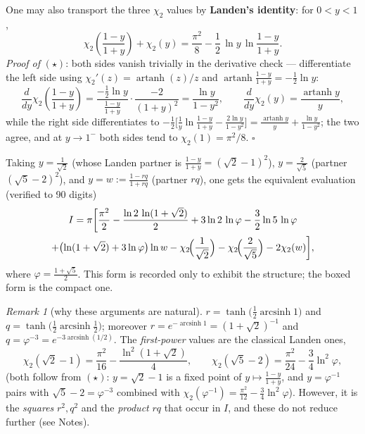 \documentclass[11pt]{article}
\theoremstyle{remark}
\newtheorem*{remark}{Remark}
\begin{document}
One may also transport the three $\chi_2$ values by \textbf{Landen's identity}: for $0<y<1$,
\begin{equation*}
\chi_2\!\left(\frac{1-y}{1+y}\right)+\chi_2(y)=\frac{\pi^2}{8}-\frac12\,\ln y\,\ln\frac{1-y}{1+y}. \tag{$\star$}
\end{equation*}
\emph{Proof of} $(\star)$: both sides vanish trivially in the derivative check --- differentiate the left side using $\chi_2'(z)=\operatorname{artanh}(z)/z$ and $\operatorname{artanh}\frac{1-y}{1+y}=-\frac12\ln y$:
\[
\frac{d}{dy}\chi_2\!\left(\frac{1-y}{1+y}\right)=\frac{-\frac12\ln y}{\frac{1-y}{1+y}}\cdot\frac{-2}{(1+y)^2}=\frac{\ln y}{1-y^2},\qquad
\frac{d}{dy}\chi_2(y)=\frac{\operatorname{artanh} y}{y},
\]
while the right side differentiates to $-\frac12\bigl[\frac1y\ln\frac{1-y}{1+y}-\frac{2\ln y}{1-y^2}\bigr]=\frac{\operatorname{artanh}y}{y}+\frac{\ln y}{1-y^2}$; the two agree, and at $y\to1^-$ both sides tend to $\chi_2(1)=\pi^2/8$. $\square$

Taking $y=\frac1{\sqrt2}$ (whose Landen partner is $\frac{1-y}{1+y}=(\sqrt2-1)^2$), $y=\frac{2}{\sqrt5}$ (partner $(\sqrt5-2)^2$), and $y=w:=\frac{1-rq}{1+rq}$ (partner $rq$), one gets the equivalent evaluation (verified to 90 digits)
\begin{multline*}
I=\pi\biggl[\frac{\pi^{2}}{2}-\frac{\ln 2\,\ln(1+\sqrt2)}{2}+3\ln 2\,\ln\varphi-\frac{3}{2}\ln 5\,\ln\varphi\\
+\bigl(\ln(1+\sqrt2)+3\ln\varphi\bigr)\ln w
-\chi_2\!\Bigl(\frac{1}{\sqrt2}\Bigr)-\chi_2\!\Bigl(\frac{2}{\sqrt5}\Bigr)-2\chi_2(w)\biggr],
\end{multline*}
where $\varphi=\frac{1+\sqrt5}{2}$. This form is recorded only to exhibit the structure; the boxed form is the compact one.

\begin{remark}[why these arguments are natural]
$r=\tanh\bigl(\tfrac12\operatorname{arcsinh}1\bigr)$ and $q=\tanh\bigl(\tfrac12\operatorname{arcsinh}\tfrac12\bigr)$; moreover $r=e^{-\operatorname{arcsinh}1}=(1+\sqrt2)^{-1}$ and $q=\varphi^{-3}=e^{-3\operatorname{arcsinh}(1/2)}$. The \emph{first-power} values are the classical Landen ones,
\[
\chi_2(\sqrt2-1)=\frac{\pi^2}{16}-\frac{\ln^2(1+\sqrt2)}{4},\qquad
\chi_2(\sqrt5-2)=\frac{\pi^2}{24}-\frac34\ln^2\varphi,
\]
(both follow from $(\star)$: $y=\sqrt2-1$ is a fixed point of $y\mapsto\frac{1-y}{1+y}$, and $y=\varphi^{-1}$ pairs with $\sqrt5-2=\varphi^{-3}$ combined with $\chi_2(\varphi^{-1})=\frac{\pi^2}{12}-\frac34\ln^2\varphi$). However, it is the \emph{squares} $r^2,q^2$ and the \emph{product} $rq$ that occur in $I$, and these do not reduce further (see Notes).
\end{remark}
\end{document}
